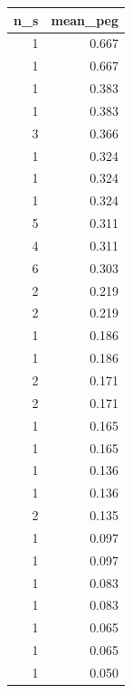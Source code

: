 \begin{tabular}{rr}
\toprule
n_s & mean_peg \\
\midrule
1 & 0.667 \\
1 & 0.667 \\
1 & 0.383 \\
1 & 0.383 \\
3 & 0.366 \\
1 & 0.324 \\
1 & 0.324 \\
1 & 0.324 \\
5 & 0.311 \\
4 & 0.311 \\
6 & 0.303 \\
2 & 0.219 \\
2 & 0.219 \\
1 & 0.186 \\
1 & 0.186 \\
2 & 0.171 \\
2 & 0.171 \\
1 & 0.165 \\
1 & 0.165 \\
1 & 0.136 \\
1 & 0.136 \\
2 & 0.135 \\
1 & 0.097 \\
1 & 0.097 \\
1 & 0.083 \\
1 & 0.083 \\
1 & 0.065 \\
1 & 0.065 \\
1 & 0.050 \\
\bottomrule
\end{tabular}
